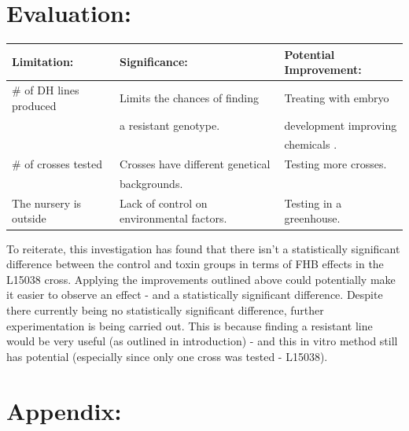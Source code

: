 \documentclass[11pt]{article}
\begin{document}
\section{Evaluation:}
\label{sec:org2a9b92c}
\begin{center}
\begin{tabular}{lll}
\hline
Limitation: & Significance: & Potential Improvement:\\
\hline
\# of DH lines produced \footnotemark & Limits the chances of finding & Treating with embryo\\
 & a resistant genotype. & development improving\\
 &  & chemicals \cite{poster}.\\
\# of crosses tested & Crosses have different genetical & Testing more crosses.\\
 & backgrounds. & \\
The nursery is outside & Lack of control on environmental factors. & Testing in a greenhouse.\\
\hline
\end{tabular}
\end{center}
To reiterate, this investigation has found that there isn't a statistically significant difference between the control and toxin groups in terms of FHB effects in the L15038 cross. Applying the improvements outlined above could potentially 
make it easier to observe an effect - and a statistically significant difference. Despite there currently being no statistically significant difference, further experimentation is being carried out.
This is because finding a resistant line would be very useful (as outlined in introduction) - and this in vitro method still has potential (especially since only one cross was tested - L15038).  



\section{Appendix:}
\label{sec:orge5e40b2}
\end{document}

